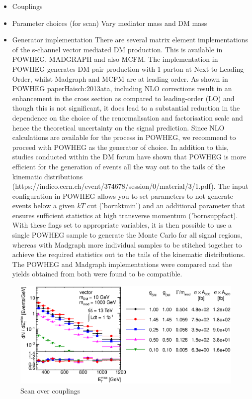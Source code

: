 \begin{itemize}
\begin{itemize}
\end{itemize}
\item Couplings
\item Parameter choices (for scan)
Vary mediator mass and DM mass 
\item Generator implementation
There are several matrix element implementations of the s-channel vector mediated DM production. This is available in POWHEG, MADGRAPH and also MCFM.
The implementation in POWHEG generates DM pair production with 1 parton at Next-to-Leading-Order, whilst Madgraph and MCFM are at leading order. As shown in POWHEG paper{Haisch:2013ata}, including NLO corrections result in an enhancement in the cross section as compared to leading-order (LO) and though this is not significant, it does lead to a substantial reduction in the dependence on the choice of the renormalisation and factorisation scale and hence the theoretical uncertainty on the signal prediction. 
Since NLO calculations are available for the process in POWHEG, we recommend to proceed with POWHEG as the generator of choice. 
In addition to this, studies conducted within the DM forum have shown that POWHEG is more efficient for the generation of events all the way out to the tails of the kinematic distributions (https://indico.cern.ch/event/374678/session/0/material/3/1.pdf). 
The input configuration in POWHEG allows you to set parameters to not generate events below a given $k{T}$ cut ('bornktmin') and an additional parameter that ensures sufficient statistics at high transverse momentum ('bornsuppfact). With these flags set to appropriate variables, it is then possible to use a single POWHEG sample to generate the Monte Carlo for all signal regions, whereas with Madgraph more individual samples to be stitched together to achieve the required statistics out to the tails of the kinematic distributions. 
The POWHEG and Madgraph implementations were compared and the yields obtained from both were found to be compatible.  
\end{itemize}

\begin{figure}
\centering
\includegraphics[width=0.9\linewidth]{figures/monojet/scan_g_V_10_1000.eps}
\caption{Scan over couplings}
\label{fig:monojet_scan_V_g}
\end{figure}

